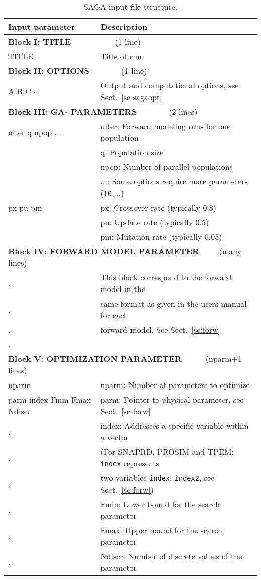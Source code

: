 \documentclass{saclantc}
\begin{document}
\begin{table}
\begin{center}
\small
\begin{tabular}{|l|l|}
\hline \hline
Input parameter & Description \\
\hline \hline

\multicolumn{2}{|l|}{{\bf Block I: TITLE}~~~~~~~~~~~(1 line)}  \\ \hline
TITLE & Title of run  \\
\hline
\multicolumn{2}{|l|}{{\bf Block II: OPTIONS}~~~~~~~~(1 line)} \\ \hline
A B C $\cdots$ & Output and computational options, see Sect.\ \ref{se:sagaopt}   \\
\hline
\multicolumn{2}{|l|}{{\bf Block III: GA- PARAMETERS}~~~~~~~~(2 lines)}  \\ \hline
niter q npop ...& niter: Forward modeling runs for one
population  \\
 	& q: Population size \\
 	& npop: Number of parallel populations  \\
        & ...: Some options require more parameters  
          ({\tt t0},...)\\
px pu pm& px:  Crossover rate (typically 0.8) \\
        & pu:  Update rate (typically 0.5)    \\
        & pm:  Mutation rate (typically 0.05) \\
\hline
\multicolumn{2}{|l|}{{\bf Block IV: FORWARD MODEL PARAMETER}~~~~~(many lines)} \\ \hline
.       & This block correspond to the forward model in the   \\
.        &  same format as given in the users manual for each  \\
.        & forward model. See  Sect.\ \ref{se:forw}    \\
.	 &  \\ 
\hline
\multicolumn{2}{|l|}{{\bf Block V: OPTIMIZATION
                                  PARAMETER}~~~~~~(nparm+1 lines)}\\ \hline
nparm  & nparm: Number of parameters  to optimize    \\ 
parm index Fmin Fmax Ndiscr &  parm: Pointer to 
physical parameter, see  Sect.\ \ref{se:forw} \\
.     &index: Addresses a specific variable within a vector\\
.    &(For {\sf SNAPRD}, {\sf PROSIM} and {\sf TPEM}: {\tt index} represents \\
.     &  two variables {\tt index}, {\tt index2}, see Sect.\ \ref{se:forw})\\
.    & Fmin: Lower bound for the search parameter\\
.    & Fmax: Upper bound for the search parameter \\
.    & Ndiscr:	Number of discrete values of the parameter\\
\hline
\end{tabular}
\end{center}
\caption{ {\sf SAGA} input file structure.
 \label{tab:saga} }
\end{table} 
\end{document}
